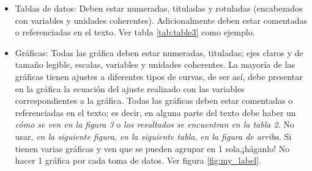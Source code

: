\documentclass[a4paper, amsfonts, amssymb, amsmath, reprint, showkeys, nofootinbib, twoside]{revtex4-1}
\begin{document}
\begin{itemize}
    \item Tablas de datos: Deben estar numeradas, tituladas y rotuladas (encabezados con variables y  unidades  coherentes).  Adicionalmente  deben  estar  comentadas  o  referenciadas  en  el texto. Ver tabla \ref{tab:table3} como ejemplo. 
    \item Gráficas: Todas las gráfica deben estar numeradas, tituladas; ejes claros y de tamaño legible, escalas, variables y unidades coherentes. La mayoría de las gráficas tienen ajustes a diferentes tipos de curvas, de ser así, debe presentar en la gráfica la ecuación del ajuste realizado  con  las  variables  correspondientes  a  la  gráfica.  Todas las gráficas deben estar comentadas o referenciadas en el texto; es decir, en alguna parte del texto debe haber un \emph{cómo se ven en la figura 3} o \emph{los resultados se encuentran en la tabla 2}. No usar, \emph{en la siguiente figura}, \emph{en la siguiente tabla}, \emph{en la figura de arriba}. Si tienen varias gráficas y ven que se pueden agrupar en 1 sola,¡háganlo! No hacer 1 gráfica por cada toma de datos. Ver figura \ref{fig:my_label}.
    

\end{itemize}
\end{document}
